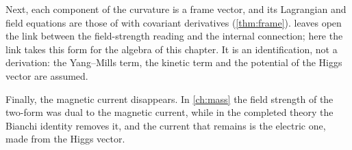 Next, each component of the curvature is a frame vector, and its Lagrangian and field equations are those of 
with covariant derivatives (\cref{thm:frame}).  leaves open the link between the field-strength reading and the internal
connection; here the link takes this form for the algebra of this chapter. It is an identification, not a derivation: the Yang--Mills term,
the kinetic term and the potential of the Higgs vector are assumed.

Finally, the magnetic current disappears. In \cref{ch:mass} the field strength of the two-form was dual to the magnetic current, while in
the completed theory the Bianchi identity removes it, and the current that remains is the electric one, made from the Higgs vector.
